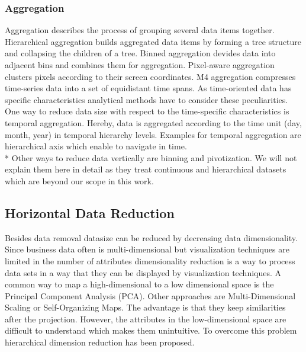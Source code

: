 \subsubsection*{Aggregation}
Aggregation describes the process of grouping several data items together. Hierarchical aggregation builds aggregated data items by forming a tree structure and collapsing the children of a tree\cite{elmqvist2010hierarchical}. Binned aggregation devides data into adjacent bins and combines them for aggregation\cite{Liu2013}. Pixel-aware aggregation clusters pixels according to their screen coordinates\cite{li2016polyspector}. M4 aggregation compresses time-series data into a set of equidistant time spans\cite{jugel2014m4}.
As time-oriented data has specific characteristics analytical methods have to consider these peculiarities. One way to reduce data size with respect to the time-specific characteristics is temporal aggregation. Hereby, data is aggregated according to the time unit (day, month, year) in temporal hierarchy levels. Examples for temporal aggregation are hierarchical axis \cite{Chung2014} which enable to navigate in time. 
\\*
Other ways to reduce data vertically are binning and pivotization. We will not explain them here in detail as they treat continuous and hierarchical datasets which are beyond our scope in this work. 

\subsection{Horizontal Data Reduction}
Besides data removal datasize can be reduced by decreasing data dimensionality. Since business data often is multi-dimensional but visualization techniques are limited in the number of attributes dimensionality reduction is a way to process data sets in a way that they can be displayed by visualization techniques. A common way to map a high-dimensional to a low dimensional space is the Principal Component Analysis (PCA)\cite{Aigner2008}. Other approaches are Multi-Dimensional Scaling or Self-Organizing Maps\cite{PiringerHarald2011}. The advantage is that they keep similarities after the projection. However, the attributes in the low-dimensional space are difficult to understand which makes them unintuitive. To overcome this problem hierarchical dimension reduction has been proposed. 



